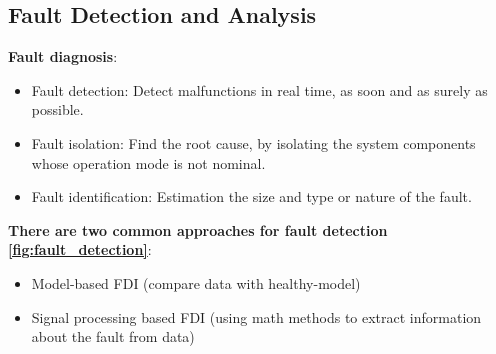 \documentclass[class=article, crop=false]{standalone}
\begin{document}
% 

\subsection{Fault Detection and Analysis}


 
\textbf{Fault diagnosis}:
\begin{itemize}
    \item{Fault detection: Detect malfunctions in real time, as soon and as
        surely as possible.}
    \item{Fault isolation: Find the root cause, by isolating the system
        components whose operation mode is not nominal.}
    \item{Fault identification: Estimation the size and type or nature of the
        fault.}
\end{itemize}

\textbf{There are two common approaches for fault detection
\ref{fig:fault_detection}}:
\begin{itemize}
\item{Model-based FDI (compare data with healthy-model)}
\item{Signal processing based FDI (using math methods to extract information
    about the fault from data)}
\end{itemize}
\end{document}
